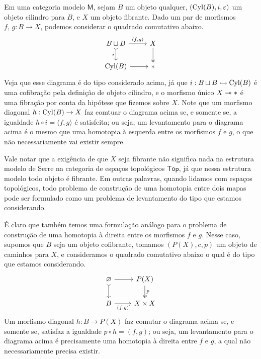 \begin{exem}
  \label{exem:homotopia_como_levantamento}
  Em uma categoria modelo $\mathsf{M}$, sejam $B$ um objeto qualquer, $(\mathrm{Cyl}(B),i,\varepsilon)$ um objeto cilindro para $B$, e $X$ um objeto fibrante.
  Dado um par de morfismos $f,\,g: B \to X$, podemos considerar o quadrado comutativo abaixo.
  \begin{displaymath}
    \begin{tikzcd}
      B \sqcup B
      \arrow[r, "{\langle f,g \rangle}"]
      \arrow[d, tail, "i" swap]
      & X
      \arrow[d, two heads]
      \\ \Cyl(B)
      \arrow[r]
      & *
    \end{tikzcd}
  \end{displaymath}
  Veja que esse diagrama é do tipo considerado acima, já que $i: B \sqcup B \rightarrowtail \mathrm{Cyl}(B)$ é uma cofibração pela definição de objeto cilindro, e o morfismo único $X \twoheadrightarrow *$ é uma fibração por conta da hipótese que fizemos sobre $X$.
  Note que um morfismo diagonal $h: \mathrm{Cyl}(B) \to X$ faz comtuar o diagrama acima se, e somente se, a igualdade $h \circ i = \langle f,g \rangle$ é satisfeita; ou seja, um levantamento para o diagrama acima é o mesmo que uma homotopia à esquerda entre os morfismos $f$ e $g$, o que não necessariamente vai existir sempre.

  Vale notar que a exigência de que $X$ seja fibrante não significa nada na estrutura modelo de Serre na categoria de espaços topológicos $\mathsf{Top}$, já que nessa estrutura modelo todo objeto é fibrante.
  Em outras palavras, quando lidamos com espaços topológicos, todo problema de construção de uma homotopia entre dois mapas pode ser formulado como um problema de levantamento do tipo que estamos considerando.

  É claro que também temos uma formulação análogo para o problema de construção de uma homotopia à direita entre os morfismos $f$ e $g$.
  Nesse caso, supomos que $B$ seja um objeto cofibrante, tomamos $(P(X),c,p)$ um objeto de caminhos para $X$, e consideramos o quadrado comutativo abaixo o qual é do tipo que estamos considerando.
  \begin{displaymath}
    \begin{tikzcd}
      \varnothing
      \arrow[d, tail]
      \arrow[r]
      & P(X)
      \arrow[d, two heads, "p"]
      \\ B
      \arrow[r, "{(f,g)}" swap]
      & X \times X
    \end{tikzcd}
  \end{displaymath}
  Um morfismo diagonal $h: B \to P(X)$ faz comutar o diagrama acima se, e somente se, satisfaz a igualdade $p \circ h = (f,g)$; ou seja, um levantamento para o diagrama acima é precisamente uma homotopia à direita entre $f$ e $g$, a qual não necessariamente precisa existir.
\end{exem}

